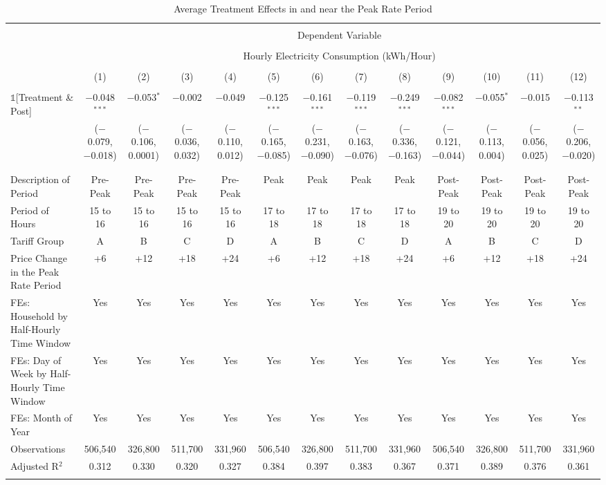 
\begin{table}[!htbp] \centering 
  \caption{Average Treatment Effects in and near the Peak Rate Period} 
  \label{Table:Average-Treatment-Effects-in-and-near-the-Peak-Rate-Period} 
\small 
\begin{tabular}{@{\extracolsep{1pt}}lcccccccccccc} 
\\[-1.8ex]\hline 
\hline \\[-1.8ex] 
 & \multicolumn{12}{c}{Dependent Variable} \\ 
\cline{2-13} 
\\[-1.8ex] & \multicolumn{12}{c}{Hourly Electricity Consumption  (kWh/Hour)} \\ 
\\[-1.8ex] & (1) & (2) & (3) & (4) & (5) & (6) & (7) & (8) & (9) & (10) & (11) & (12)\\ 
\hline \\[-1.8ex] 
 $\mathbb{1}$[Treatment \& Post] & $-$0.048$^{***}$ & $-$0.053$^{*}$ & $-$0.002 & $-$0.049 & $-$0.125$^{***}$ & $-$0.161$^{***}$ & $-$0.119$^{***}$ & $-$0.249$^{***}$ & $-$0.082$^{***}$ & $-$0.055$^{*}$ & $-$0.015 & $-$0.113$^{**}$ \\ 
  & ($-$0.079, $-$0.018) & ($-$0.106, 0.0001) & ($-$0.036, 0.032) & ($-$0.110, 0.012) & ($-$0.165, $-$0.085) & ($-$0.231, $-$0.090) & ($-$0.163, $-$0.076) & ($-$0.336, $-$0.163) & ($-$0.121, $-$0.044) & ($-$0.113, 0.004) & ($-$0.056, 0.025) & ($-$0.206, $-$0.020) \\ 
  & & & & & & & & & & & & \\ 
\hline \\[-1.8ex] 
Description of Period & Pre-Peak & Pre-Peak & Pre-Peak & Pre-Peak & Peak & Peak & Peak & Peak & Post-Peak & Post-Peak & Post-Peak & Post-Peak \\ 
Period of Hours & 15 to 16 & 15 to 16 & 15 to 16 & 15 to 16 & 17 to 18 & 17 to 18 & 17 to 18 & 17 to 18 & 19 to 20 & 19 to 20 & 19 to 20 & 19 to 20 \\ 
Tariff Group & A & B & C & D & A & B & C & D & A & B & C & D \\ 
Price Change in the Peak Rate Period & +6 & +12 & +18 & +24 & +6 & +12 & +18 & +24 & +6 & +12 & +18 & +24 \\ 
FEs: Household by Half-Hourly Time Window & Yes & Yes & Yes & Yes & Yes & Yes & Yes & Yes & Yes & Yes & Yes & Yes \\ 
FEs: Day of Week by Half-Hourly Time Window & Yes & Yes & Yes & Yes & Yes & Yes & Yes & Yes & Yes & Yes & Yes & Yes \\ 
FEs: Month of Year & Yes & Yes & Yes & Yes & Yes & Yes & Yes & Yes & Yes & Yes & Yes & Yes \\ 
Observations & 506,540 & 326,800 & 511,700 & 331,960 & 506,540 & 326,800 & 511,700 & 331,960 & 506,540 & 326,800 & 511,700 & 331,960 \\ 
Adjusted R$^{2}$ & 0.312 & 0.330 & 0.320 & 0.327 & 0.384 & 0.397 & 0.383 & 0.367 & 0.371 & 0.389 & 0.376 & 0.361 \\ 
\hline 
\hline \\[-1.8ex] 
\end{tabular} 
\end{table} 
